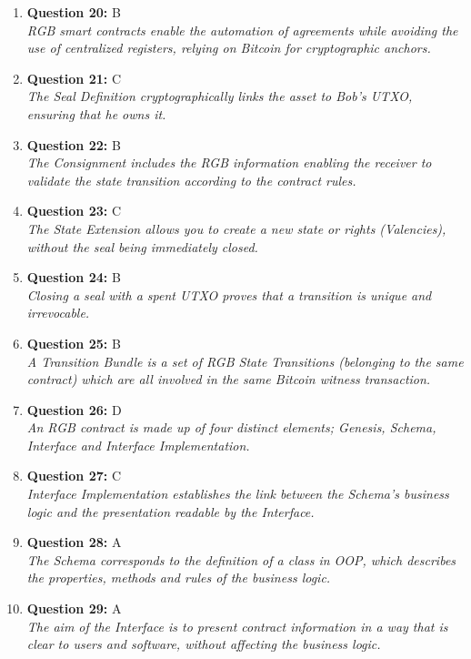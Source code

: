 \documentclass[12pt,a4paper]{article}
\begin{document}
\begin{enumerate}
\item \textbf{Question 20:} B
\\ \textit{RGB smart contracts enable the automation of agreements while avoiding the use of centralized registers, relying on Bitcoin for cryptographic anchors.}

\item \textbf{Question 21:} C
\\ \textit{The Seal Definition cryptographically links the asset to Bob's UTXO, ensuring that he owns it.}

\item \textbf{Question 22:} B
\\ \textit{The Consignment includes the RGB information enabling the receiver to validate the state transition according to the contract rules.}

\item \textbf{Question 23:} C
\\ \textit{The State Extension allows you to create a new state or rights (Valencies), without the seal being immediately closed.}

\item \textbf{Question 24:} B
\\ \textit{Closing a seal with a spent UTXO proves that a transition is unique and irrevocable.}

\item \textbf{Question 25:} B
\\ \textit{A Transition Bundle is a set of RGB State Transitions (belonging to the same contract) which are all involved in the same Bitcoin witness transaction.}

\item \textbf{Question 26:} D
\\ \textit{An RGB contract is made up of four distinct elements; Genesis, Schema, Interface and Interface Implementation.}

\item \textbf{Question 27:} C
\\ \textit{Interface Implementation establishes the link between the Schema's business logic and the presentation readable by the Interface.}

\item \textbf{Question 28:} A
\\ \textit{The Schema corresponds to the definition of a class in OOP, which describes the properties, methods and rules of the business logic.}

\item \textbf{Question 29:} A
\\ \textit{The aim of the Interface is to present contract information in a way that is clear to users and software, without affecting the business logic.}


\end{enumerate}
\end{document}
